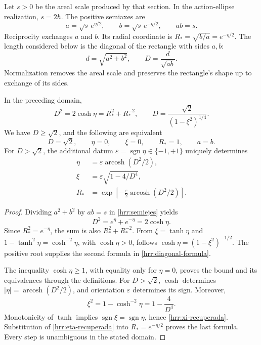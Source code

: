 Let \(s>0\) be the areal scale produced by that section. In the action-ellipse realization, \(s=2\hbar\). The positive semiaxes are
\begin{equation}
 a=\sqrt{s}\,e^{\eta/2},\qquad
 b=\sqrt{s}\,e^{-\eta/2},\qquad ab=s.
 \label{hrr:semiejes}
\end{equation}
Reciprocity exchanges \(a\) and \(b\). Its radial coordinate is \(R_*=\sqrt{b/a}=e^{-\eta/2}\). The length considered below is the diagonal of the rectangle with sides \(a,b\):
\[
 d=\sqrt{a^2+b^2},\qquad D=\frac{d}{\sqrt{ab}}.
\]
Normalization removes the areal scale and preserves the rectangle's shape up to exchange of its sides.

\begin{theorem}
\label{hrr:diagonal-teorema} In the preceding domain,
\begin{equation}
 D^2=2\cosh\eta=R_*^2+R_*^{-2},
 \qquad
 D=\frac{\sqrt2}{(1-\xi^2)^{1/4}}.
 \label{hrr:diagonal-formula}
\end{equation}
We have \(D\geq\sqrt2\), and the following are equivalent
\[
 D=\sqrt2,\qquad \eta=0,\qquad \xi=0,\qquad R_*=1,
 \qquad a=b.
\]
For \(D>\sqrt2\), the additional datum \(\varepsilon=\operatorname{sgn}\eta\in\{-1,+1\}\) uniquely determines
\begin{align}
 \eta&=\varepsilon\operatorname{arcosh}(D^2/2),
 \label{hrr:eta-recuperada}\\
 \xi&=\varepsilon\sqrt{1-4/D^4},
 \label{hrr:xi-recuperada}\\
 R_*&=\exp\!\left[-\frac{\varepsilon}{2}
                   \operatorname{arcosh}(D^2/2)\right].
 \label{hrr:radio-recuperado}
\end{align}
\end{theorem}
\begin{proof}
Dividing \(a^2+b^2\) by \(ab=s\) in \eqref{hrr:semiejes} yields
\[
 D^2=e^{\eta}+e^{-\eta}=2\cosh\eta.
\]
Since \(R_*^2=e^{-\eta}\), the sum is also \(R_*^2+R_*^{-2}\). From \(\xi=\tanh\eta\) and \(1-\tanh^2\eta=\cosh^{-2}\eta\), with \(\cosh\eta>0\), follows \(\cosh\eta=(1-\xi^2)^{-1/2}\). The positive root supplies the second formula in \eqref{hrr:diagonal-formula}.

The inequality \(\cosh\eta\geq1\), with equality only for \(\eta=0\), proves the bound and its equivalences through the definitions. For \(D>\sqrt2\), \(\cosh\) determines \(|\eta|=\operatorname{arcosh}(D^2/2)\), and orientation \(\varepsilon\) determines its sign. Moreover,
\[
 \xi^2=1-\cosh^{-2}\eta=1-\frac4{D^4}.
\]
Monotonicity of \(\tanh\) implies \(\operatorname{sgn}\xi=\operatorname{sgn}\eta\), hence \eqref{hrr:xi-recuperada}. Substitution of \eqref{hrr:eta-recuperada} into \(R_*=e^{-\eta/2}\) proves the last formula. Every step is unambiguous in the stated domain.
\end{proof}

